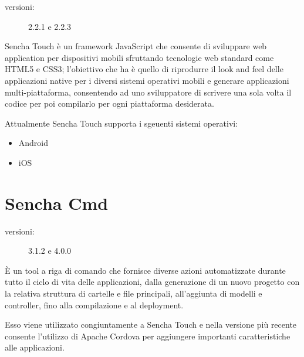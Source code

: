 \begin{description}
\item[versioni:] 2.2.1 e 2.2.3
\end{description}

Sencha Touch è un framework JavaScript che consente di sviluppare web application per dispositivi mobili sfruttando tecnologie web standard come \acs{HTML5} e \acs{CSS3}; l'obiettivo che ha è quello di riprodurre il look and feel delle applicazioni native per i diversi sistemi operativi mobili e generare applicazioni multi-piattaforma, consentendo ad uno sviluppatore di scrivere una sola volta il codice per poi compilarlo per ogni piattaforma desiderata.

Attualmente Sencha Touch supporta i sgeuenti sistemi operativi:
\begin{itemize}
\item Android
\item iOS
\end{itemize}

\section{Sencha Cmd}
\begin{description}
\item[versioni:] 3.1.2 e 4.0.0
\end{description}

È un tool a riga di comando che fornisce diverse azioni automatizzate durante tutto il ciclo di vita delle applicazioni, dalla generazione di un nuovo progetto con la relativa struttura di cartelle e file principali, all'aggiunta di modelli e controller, fino alla compilazione e al deployment.

Esso viene utilizzato congiuntamente a Sencha Touch e nella versione più recente consente l'utilizzo di Apache Cordova per aggiungere importanti caratteristiche alle applicazioni.
 
